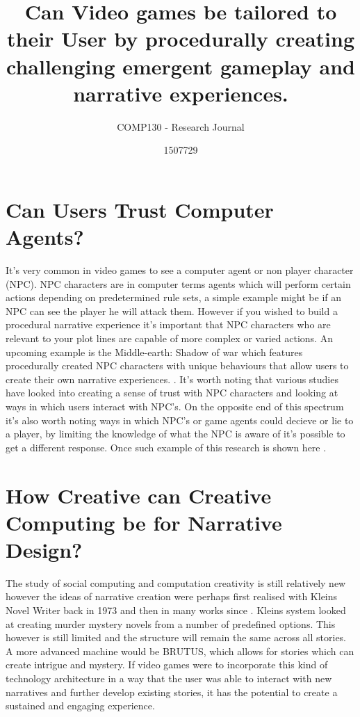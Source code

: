 \documentclass{scrartcl}
\title{Can Video games be tailored to their User by procedurally creating challenging emergent gameplay and narrative experiences.}
\subtitle{COMP130 - Research Journal}
\author{1507729}
\begin{document}
\maketitle

\abstract{}

\section{Can Users Trust Computer Agents?}

It's very common in video games to see a computer agent or non player character (NPC). NPC characters are in computer terms agents which will perform certain actions depending on predetermined rule sets, a simple example might be if an NPC can see the player he will attack them. However if you wished to build a procedural narrative experience it's important that NPC characters who are relevant to your plot lines are capable of more complex or varied actions. An upcoming example is the Middle-earth: Shadow of war which features procedurally created NPC characters with unique behaviours that allow users to create their own narrative experiences. \cite{monolith2017shadow}. It's worth noting that various studies have looked into creating a sense of trust with NPC characters and looking at ways in which users interact with NPC's. \cite{do2016trust} On the opposite end of this spectrum it's also worth noting ways in which NPC's or game agents could decieve or lie to a player, by limiting the knowledge of what the NPC is aware of it's possible to get a different response. Once such example of this research is shown here \cite{cowling2015emergent}.

\section{How Creative can Creative Computing be for Narrative Design?}

The study of social computing and computation creativity is still relatively new however the ideas of narrative creation were perhaps first realised with Kleins Novel Writer \cite{klein1973automatic} back in 1973 and then in many works since \cite{gervas2009storytelling}. Kleins system looked at creating murder mystery novels from a number of predefined options. This however is still limited and the structure will remain the same across all stories. A more advanced machine would be BRUTUS, \cite{bringsjord2000artificial} which allows for stories which can create intrigue and mystery. If video games were to incorporate this kind of technology architecture in a way that the user was able to interact with new narratives and further develop existing stories, it has the potential to create a sustained and engaging experience.
\end{document}
